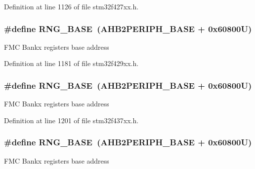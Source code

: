 Definition at line 1126 of file stm32f427xx.\+h.

\subsubsection[{\texorpdfstring{R\+N\+G\+\_\+\+B\+A\+SE}{RNG_BASE}}]{\setlength{\rightskip}{0pt plus 5cm}\#define R\+N\+G\+\_\+\+B\+A\+SE~({\bf A\+H\+B2\+P\+E\+R\+I\+P\+H\+\_\+\+B\+A\+SE} + 0x60800\+U)}\hypertarget{group___peripheral__memory__map_gab92662976cfe62457141e5b4f83d541c}{}\label{group___peripheral__memory__map_gab92662976cfe62457141e5b4f83d541c}
F\+MC Bankx registers base address 

Definition at line 1181 of file stm32f429xx.\+h.

\subsubsection[{\texorpdfstring{R\+N\+G\+\_\+\+B\+A\+SE}{RNG_BASE}}]{\setlength{\rightskip}{0pt plus 5cm}\#define R\+N\+G\+\_\+\+B\+A\+SE~({\bf A\+H\+B2\+P\+E\+R\+I\+P\+H\+\_\+\+B\+A\+SE} + 0x60800\+U)}\hypertarget{group___peripheral__memory__map_gab92662976cfe62457141e5b4f83d541c}{}\label{group___peripheral__memory__map_gab92662976cfe62457141e5b4f83d541c}
F\+MC Bankx registers base address 

Definition at line 1201 of file stm32f437xx.\+h.

\subsubsection[{\texorpdfstring{R\+N\+G\+\_\+\+B\+A\+SE}{RNG_BASE}}]{\setlength{\rightskip}{0pt plus 5cm}\#define R\+N\+G\+\_\+\+B\+A\+SE~({\bf A\+H\+B2\+P\+E\+R\+I\+P\+H\+\_\+\+B\+A\+SE} + 0x60800\+U)}\hypertarget{group___peripheral__memory__map_gab92662976cfe62457141e5b4f83d541c}{}\label{group___peripheral__memory__map_gab92662976cfe62457141e5b4f83d541c}
F\+MC Bankx registers base address 

